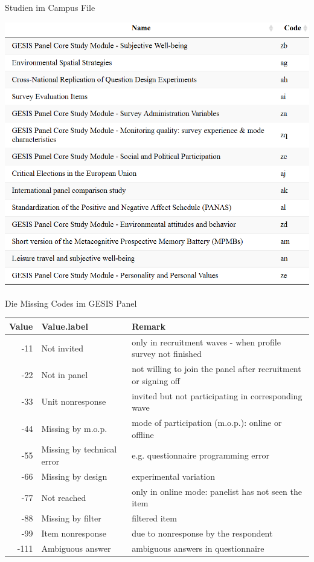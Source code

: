 \documentclass[ignorenonframetext,]{beamer}
\begin{document}
\begin{frame}{Studien im Campus File}

\includegraphics{figure/GPstudies_CampusFile.PNG}

\end{frame}

\begin{frame}{Die Missing Codes im GESIS Panel}

\begin{table}[H]
\centering\begingroup\fontsize{7}{9}\selectfont

\begin{tabular}{r|l|l}
\hline
Value & Value.label & Remark\\
\hline
-11 & Not invited & only in recruitment waves - when profile survey not finished\\
\hline
-22 & Not in panel & not willing to join the panel after recruitment or signing off\\
\hline
-33 & Unit nonresponse & invited but not participating in corresponding wave\\
\hline
-44 & Missing by m.o.p. & mode of participation (m.o.p.): online or offline\\
\hline
-55 & Missing by technical error & e.g. questionnaire programming error\\
\hline
-66 & Missing by design & experimental variation\\
\hline
-77 & Not reached & only in online mode: panelist has not seen the item\\
\hline
-88 & Missing by filter & filtered item\\
\hline
-99 & Item nonresponse & due to nonresponse by the respondent\\
\hline
-111 & Ambiguous answer & ambiguous answers in questionnaire\\
\hline
\end{tabular}\endgroup{}
\end{table}

\end{frame}
\end{document}
